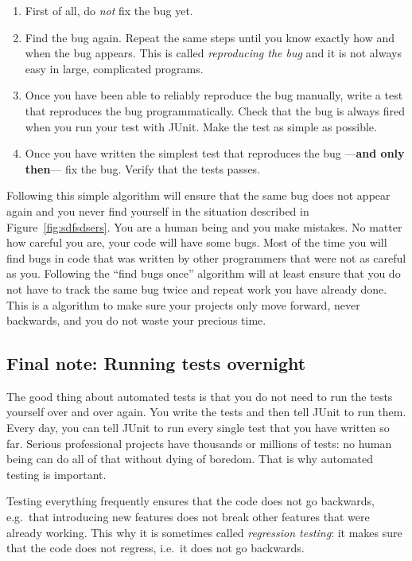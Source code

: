 \begin{enumerate}
\item First of all, do \emph{not} fix the bug yet. 
\item Find the bug again. Repeat the same steps until you know exactly
  how and when the bug appears. This is called
  \emph{reproducing the bug} and it is not always easy in large,
  complicated programs.
\item Once you have been able to reliably reproduce the bug manually,
  write a test that reproduces the bug programmatically. Check that
  the bug is always fired when you run your test with JUnit. Make the
  test as simple as possible.
\item Once you have written the simplest test that reproduces the bug
  ---\textbf{and only then}--- fix the bug. Verify that the tests passes. 
\end{enumerate}

Following this simple algorithm will ensure that the same bug does not
appear again and you never find yourself in the situation described in
Figure~\ref{fig:sdfsdsers}. You are a human being and you make mistakes. No
matter how careful you are, your code will have some bugs. Most of the
time you will find bugs in code that was written by other programmers
that were not as careful as you. Following the ``find bugs once''
algorithm will at least ensure that you do not have to track the same bug
twice and repeat work you have already done. This is a algorithm to make
sure your projects only move forward, never backwards, and you do not
waste your precious time. 

\subsection*{Final note: Running tests overnight}
\label{sec:runn-tests-overn}

The good thing about automated tests is that you do not need to run
the tests yourself over and over again. You write the tests and then
tell JUnit to run them. Every day, you can tell JUnit to run every
single test that you have written so far. Serious professional
projects have thousands or millions of tests: no human being can do
all of that without dying of boredom. That is why automated testing is
important. 

Testing everything frequently ensures that the code does not go
backwards, e.g.~that introducing new features does not break other
features that were already working. This why it is sometimes called
\emph{regression testing}: it makes sure that the code does not
regress, i.e.~it does not go backwards. 

